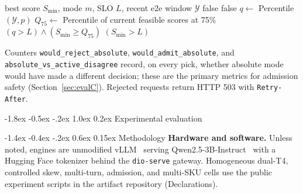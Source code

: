 \documentclass[pdflatex,sn-mathphys-num]{sn-jnl}
\makeatletter
\renewcommand{\section}{\@startsection{section}{1}{\z@}%
  {-1.8ex \@plus -0.5ex \@minus -.2ex}%
  {1.0ex \@plus 0.2ex}%
  {\normalfont\large\bfseries}}%
\renewcommand{\subsection}{\@startsection{subsection}{2}{\z@}%
  {-1.4ex \@plus -0.4ex \@minus -.2ex}%
  {0.6ex \@plus 0.15ex}%
  {\normalfont\normalsize\bfseries}}%
\makeatother
\begin{document}
\begin{algorithm}[ht]
\caption{AdmissionReject$(S_{\min}, m)$}
\label{alg:admission}
\begin{algorithmic}[1]
\Require best score $S_{\min}$, mode $m$, SLO $L$, recent e2e window $\mathcal{Y}$
 \Return false
\EndIf
{}
   \Return false 
  \EndIf
  \State $q \leftarrow$ Percentile$(\mathcal{Y},p)$
  \State $Q_{75} \leftarrow$ Percentile of current feasible scores at 75\%
  \State \Return $(q > L) \land (S_{\min} \ge Q_{75})$
\EndIf
\State \Return $(S_{\min} > L)$ 
\end{algorithmic}
\end{algorithm}

Counters \texttt{would\_reject\_absolute}, \texttt{would\_admit\_absolute}, and
\texttt{absolute\_vs\_active\_disagree} record, on every pick, whether absolute mode
would have made a different decision; these are the primary metrics for admission
safety (Section~\ref{sec:evalC}). Rejected requests return HTTP 503 with
\texttt{Retry-After}.

\section{Experimental evaluation}
\label{sec:evaluation}

\subsection{Methodology}
\label{sec:method}
\textbf{Hardware and software.} Unless noted, engines are unmodified
vLLM~\cite{vllm} serving Qwen2.5-3B-Instruct~\cite{qwen25} with a Hugging Face
tokenizer behind the \texttt{dio-serve} gateway. Homogeneous dual-T4, controlled
skew, multi-turn, admission, and multi-SKU cells use the public experiment
scripts in the artifact repository (Declarations).
\end{document}
